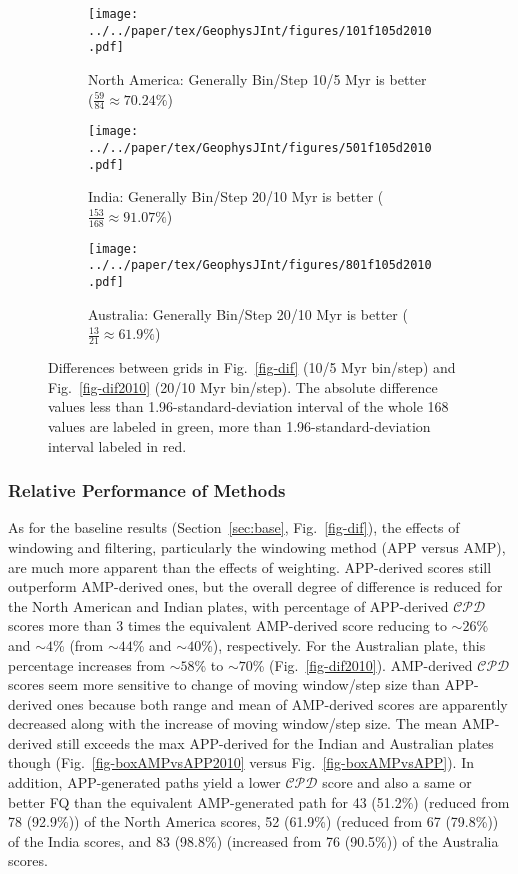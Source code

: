 \begin{figure*}
	\centering
	\begin{subfigure}{1\textwidth}
		\texttt{[image: ../../paper/tex/GeophysJInt/figures/101f105d2010.pdf]}
		\caption{North America: Generally Bin/Step 10/5 Myr is better
		($\frac{59}{84}\approx70.24\%$)}\label{fig-101f105d2010}
	\end{subfigure}
	\vspace{.1em}
	\begin{subfigure}{1\textwidth}
		\texttt{[image: ../../paper/tex/GeophysJInt/figures/501f105d2010.pdf]}
		\caption{India: Generally Bin/Step 20/10 Myr is better
		($\frac{153}{168}\approx91.07\%$)}\label{fig-501f105d2010}
	\end{subfigure}
	\vspace{.1em}
	\begin{subfigure}{1\textwidth}
		\texttt{[image: ../../paper/tex/GeophysJInt/figures/801f105d2010.pdf]}
		\caption{Australia: Generally Bin/Step 20/10 Myr is better
		($\frac{13}{21}\approx61.9\%$)}\label{fig-801f105d2010}
	\end{subfigure}
	\caption[]{Differences between grids in Fig.~\ref{fig-dif} (10/5 Myr
bin/step) and Fig.~\ref{fig-dif2010} (20/10 Myr bin/step). The absolute
difference values less than 1.96-standard-deviation interval of the whole 168
values are labeled in green, more than 1.96-standard-deviation interval labeled
in red.}\label{fig-f105d2010}
\end{figure*}

\subsubsection{Relative Performance of Methods}

As for the baseline results (Section~\ref{sec:base}, Fig.~\ref{fig-dif}), the
effects of windowing and filtering, particularly the windowing method (APP
versus AMP), are much more apparent than the effects of weighting. APP-derived
scores still outperform AMP-derived ones, but the overall degree of difference
is reduced for the North American and Indian plates, with percentage of
APP-derived $\mathcal{CPD}$ scores more than 3 times the equivalent AMP-derived
score reducing to ${\sim}26$\% and ${\sim}4$\% (from ${\sim}44$\% and
${\sim}40$\%), respectively. For the Australian plate, this percentage increases
from ${\sim}58$\% to ${\sim}70$\% (Fig.~\ref{fig-dif2010}). AMP-derived
$\mathcal{CPD}$ scores seem more sensitive to change of moving window/step size
than APP-derived ones because both range and mean of AMP-derived scores are
apparently decreased along with the increase of moving window/step size. The
mean AMP-derived still exceeds the max APP-derived for the Indian and Australian
plates though (Fig.~\ref{fig-boxAMPvsAPP2010} versus
Fig.~\ref{fig-boxAMPvsAPP}). In addition, APP-generated paths yield a lower
$\mathcal{CPD}$ score and also a same or better FQ than the equivalent
AMP-generated path for 43 (51.2\%) (reduced from 78 (92.9\%)) of the North
America scores, 52 (61.9\%) (reduced from 67 (79.8\%)) of the India scores, and
83 (98.8\%) (increased from 76 (90.5\%)) of the Australia scores.


